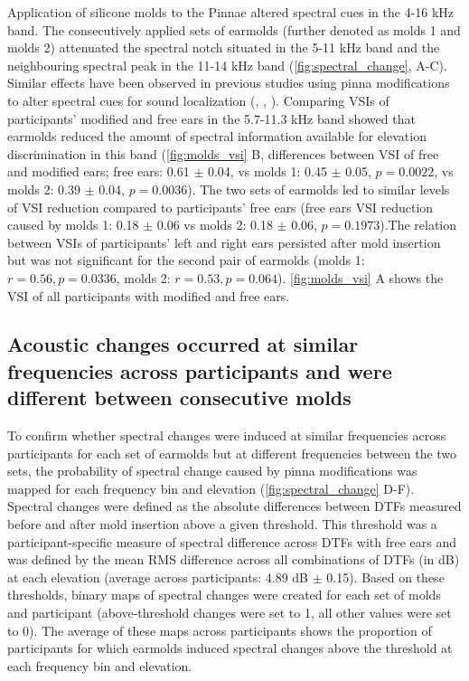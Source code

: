 Application of silicone molds to the Pinnae altered spectral cues in the 4-16 kHz band. The consecutively applied sets of earmolds (further denoted as molds 1 and molds 2) attenuated the spectral notch situated in the 5-11 kHz band and the neighbouring spectral peak in the 11-14 kHz band (\cref{fig:spectral_change}, A-C). Similar effects have been observed in previous studies using pinna modifications to alter spectral cues for sound localization (\citet{trapeau_fast_2016}, \citet{wanrooij_relearning_2005}, \citet{hofman_relearning_1998}). Comparing VSIs of participants' modified and free ears in the 5.7-11.3 kHz band showed that earmolds reduced the amount of spectral information available for elevation discrimination in this band (\cref{fig:molds_vsi} B, differences between VSI of free and modified ears; free ears: 0.61 $\pm$ 0.04, vs molds 1: 0.45 $\pm$ 0.05, $p = 0.0022$, vs molds 2: 0.39 $\pm$ 0.04, $p = 0.0036$). The two sets of earmolds led to similar levels of VSI reduction compared to participants' free ears (free ears VSI reduction caused by molds 1: 0.18 $\pm$ 0.06 vs molds 2: 0.18 $\pm$ 0.06, $p = 0.1973$).The relation between VSIs of participants' left and right ears persisted after mold insertion but was not significant for the second pair of earmolds (molds 1: $r = 0.56, p = 0.0336$, molds 2: $r = 0.53, p = 0.064$). \cref{fig:molds_vsi} A shows the VSI of all participants with modified and free ears.

\subsection{Acoustic changes occurred at similar frequencies across participants and were different between consecutive molds}

 
To confirm whether spectral changes were induced at similar frequencies across participants for each set of earmolds but at different frequencies between the two sets, the probability of spectral change caused by pinna modifications was mapped for each frequency bin and elevation (\cref{fig:spectral_change} D-F). Spectral changes were defined as the absolute differences between DTFs measured before and after mold insertion above a given threshold. This threshold was a participant-specific measure of spectral difference across DTFs with free ears and was defined by the mean RMS difference across all combinations of DTFs (in dB) at each elevation (average across participants: 4.89 dB $\pm$ 0.15). Based on these thresholds, binary maps of spectral changes were created for each set of molds and participant (above-threshold changes were set to 1, all other values were set to 0). The average of these maps across participants shows the proportion of participants for which earmolds induced spectral changes above the threshold at each frequency bin and elevation.

